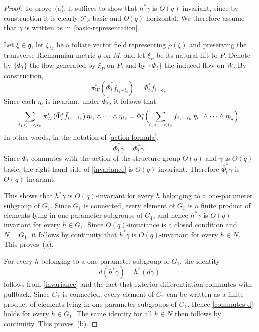 \documentclass[reqno, 11pt]{amsart}
\theoremstyle{definition}
\theoremstyle{property}
\theoremstyle{remark}
\numberwithin{equation}{section}
\begin{document}
\begin{proof}
To prove~(a), it suffices to show that $h^*\gamma$ is $O(q)$-invariant, since by construction it is clearly $\mathcal{F}_P$-basic and $O(q)$-horizontal. We therefore assume that $\gamma$ is written as in \eqref{basic-representation}.

Let $\xi\in \mathfrak{g}$, let $\xi_M$ be a foliate vector field representing
$\rho(\xi)$ and preserving the transverse Riemannian metric $g$ on $M$, and let $\xi_P$ be its natural lift to $P$. Denote by
$\{\Phi_t\}$ the flow generated by $\xi_P$ on $P$, and by
$\{\bar{\Phi}_t\}$ the induced flow on $W$. By construction,
\[
\pi_W^*(\bar{\Phi}_t^*\bar{f}_{i_1\cdots i_k})
=
\Phi_t^*f_{i_1\cdots i_k}.
\]
Since each $\eta_i$ is invariant under $\Phi_t^*$, it follows that
\[
\sum_{i_1<\cdots<i_k}
\pi_W^*(\bar{\Phi}_t^*\bar{f}_{i_1\cdots i_k})\,
\eta_{i_1}\wedge\cdots\wedge \eta_{i_k}
=
\Phi_t^*
\Bigl(
\sum_{i_1<\cdots<i_k}
f_{i_1\cdots i_k}\,
\eta_{i_1}\wedge\cdots\wedge \eta_{i_k}
\Bigr).
\]
In other words, in the notation of \eqref{action-formula},
\begin{equation}\label{invariance}
\bar{\Phi}_t^*\gamma=\Phi_t^*\gamma.
\end{equation}
Since $\Phi_t$ commutes with the action of the structure group $O(q)$ and
$\gamma$ is $O(q)$-basic, the right-hand side of \eqref{invariance} is
$O(q)$-invariant. Therefore $\bar{\Phi}_t^*\gamma$ is $O(q)$-invariant.

This shows that $h^*\gamma$ is $O(q)$-invariant for every $h$ belonging to a
one-parameter subgroup of $G_1$. Since $G_1$ is connected, every element of
$G_1$ is a finite product of elements lying in one-parameter subgroups of
$G_1$, and hence $h^*\gamma$ is $O(q)$-invariant for every $h\in G_1$. Since
$O(q)$-invariance is a closed condition and $N=\overline{G_1}$, it follows by
continuity that $h^*\gamma$ is $O(q)$-invariant for every $h\in N$. This proves~(a).

For every $h$ belonging to a one-parameter subgroup of $G_1$, the identity
\begin{equation}\label{commutes-d}
d(h^*\gamma)=h^*(d\gamma)
\end{equation}
follows from \eqref{invariance} and the fact that exterior differentiation
commutes with pullback. Since $G_1$ is connected, every element of $G_1$ can be
written as a finite product of elements lying in one-parameter subgroups of
$G_1$. Hence \eqref{commutes-d} holds for every $h\in G_1$. The same identity
for all $h\in N$ then follows by continuity. This proves~(b).
\end{proof}
\end{document}
